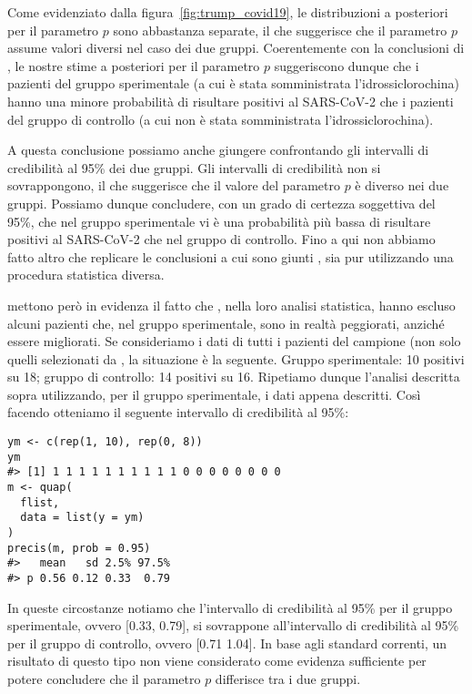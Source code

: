 Come evidenziato dalla figura~\ref{fig:trump_covid19}, le distribuzioni a posteriori per il parametro $p$  sono abbastanza separate, il che suggerisce che il parametro $p$ assume valori diversi nel caso dei due gruppi.
Coerentemente con la conclusioni di \citet{Gautret_2020}, le nostre stime a posteriori per il parametro $p$ suggeriscono dunque che i pazienti del gruppo sperimentale (a cui è stata somministrata l'idrossiclorochina) hanno una minore probabilità di risultare positivi al SARS-CoV-2 che i pazienti del gruppo di controllo (a cui non è stata somministrata l'idrossiclorochina). 

A questa conclusione possiamo anche giungere confrontando gli intervalli di credibilità al 95\% dei due gruppi.
Gli intervalli di credibilità non si sovrappongono, il che suggerisce che il valore del parametro $p$ è diverso nei due gruppi.
Possiamo dunque concludere, con un grado di certezza soggettiva del 95\%, che nel gruppo sperimentale vi è una probabilità più bassa di risultare positivi al SARS-CoV-2 che nel gruppo di controllo.
Fino a qui non abbiamo fatto altro che replicare le conclusioni a cui sono giunti \citet{Gautret_2020}, sia pur utilizzando una procedura statistica diversa.

\citet{Hulme_2020} mettono però in evidenza il fatto che \citet{Gautret_2020}, nella loro analisi statistica, hanno escluso alcuni pazienti che, nel gruppo sperimentale, sono in realtà peggiorati, anziché essere migliorati. 
Se consideriamo i dati di tutti i pazienti del campione (non solo quelli selezionati da \citet{Gautret_2020}, la situazione è la seguente. 
Gruppo sperimentale: 10 positivi su 18; gruppo di controllo: 14 positivi su 16.
Ripetiamo dunque l'analisi descritta sopra utilizzando, per il gruppo sperimentale, i dati appena descritti.
Così facendo otteniamo il seguente intervallo di credibilità al 95\%:


\begin{lstlisting}
ym <- c(rep(1, 10), rep(0, 8))
ym
#> [1] 1 1 1 1 1 1 1 1 1 1 0 0 0 0 0 0 0 0
m <- quap( 
  flist, 
  data = list(y = ym)
)
precis(m, prob = 0.95)
#>   mean   sd 2.5% 97.5%
#> p 0.56 0.12 0.33  0.79
\end{lstlisting}



\noindent
In queste circostanze notiamo che l'intervallo di credibilità al 95\% per il gruppo sperimentale, ovvero [0.33, 0.79], si sovrappone all'intervallo di credibilità al 95\% per il gruppo di controllo, ovvero [0.71  1.04]. 
In base agli standard correnti, un risultato di questo tipo non viene considerato come evidenza sufficiente per potere concludere che il parametro $p$ differisce tra i due gruppi.

